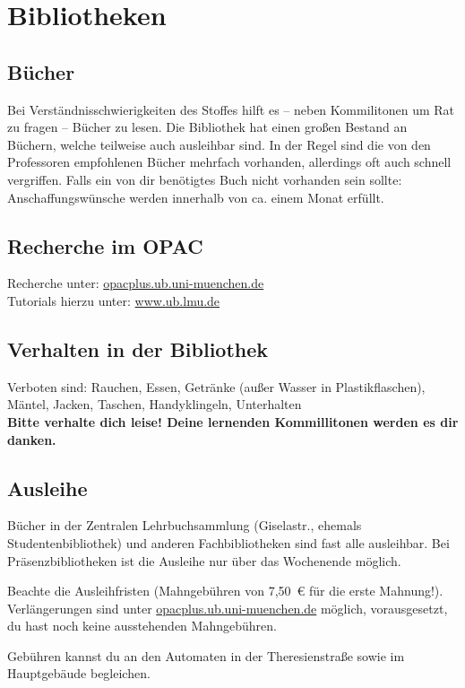 \documentclass[twoside,12pt,parskip=half-]{scrartcl}
\begin{document}
\section{Bibliotheken}

\subsection{Bücher}

Bei Verständnisschwierigkeiten des Stoffes hilft es -- neben
Kommilitonen um Rat zu fragen -- Bücher zu lesen.  Die Bibliothek
hat einen großen Bestand an Büchern, welche teilweise auch ausleihbar
sind. In der Regel sind die von den Professoren empfohlenen Bücher
mehrfach vorhanden, allerdings oft auch schnell vergriffen. Falls ein
von dir benötigtes Buch nicht vorhanden sein sollte:
Anschaffungswünsche werden innerhalb von ca. einem Monat erfüllt.

\subsection{Recherche im OPAC}
Recherche unter: \url{opacplus.ub.uni-muenchen.de}\\
Tutorials hierzu unter: \url{www.ub.lmu.de}

\subsection{Verhalten in der Bibliothek}
Verboten sind: Rauchen, Essen, Getränke (außer Wasser in Plastikflaschen), Mäntel, Jacken, Taschen, Handyklingeln, Unterhalten\\

\textbf{Bitte verhalte dich leise!
Deine lernenden Kommillitonen werden es dir danken.}

\subsection{Ausleihe}

Bücher in der Zentralen Lehrbuchsammlung (Giselastr., ehemals
Studentenbibliothek) und anderen Fachbibliotheken sind fast alle
ausleihbar. Bei Präsenzbibliotheken ist die Ausleihe nur über das
Wochenende möglich.

Beachte die Ausleihfristen (Mahngebühren von 7,50~€ für die erste
Mahnung!). Verlängerungen sind unter \url{opacplus.ub.uni-muenchen.de}
möglich, vorausgesetzt, du hast noch keine ausstehenden Mahngebühren.

Gebühren kannst du an den Automaten in der Theresienstraße sowie
im Hauptgebäude begleichen.
\end{document}
